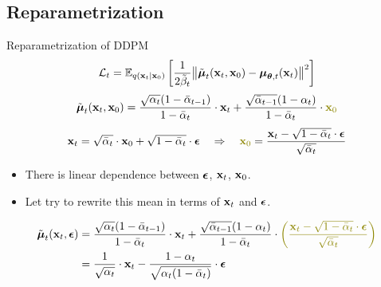 \subsection{Reparametrization}
\begin{frame}{Reparametrization of DDPM}
	\[
		\mathcal{L}_t = \mathbb{E}_{q(\mathbf{x}_t | \mathbf{x}_0)} \left[\frac{1}{2\tilde{\beta}_t} \bigl\| \tilde{\boldsymbol{\mu}}_t(\mathbf{x}_t, \mathbf{x}_0) - \boldsymbol{\mu}_{\boldsymbol{\theta}, t}(\mathbf{x}_t) \bigr\|^2  \right]
	\]
	\[
		\tilde{\bmu}_t(\bx_t, \bx_0) = \frac{\sqrt{\alpha_t}(1 - \bar{\alpha}_{t-1})}{1 - \bar{\alpha}_t} \cdot \bx_t + \frac{\sqrt{\bar{\alpha}_{t-1}}(1 - \alpha_t)}{1 - \bar{\alpha}_t} \cdot {\color{olive} \bx_0}
	\]
	\vspace{-0.2cm}
	\[
		\bx_t = \sqrt{\bar{\alpha}_t} \cdot \bx_0 + \sqrt{1 - \bar{\alpha}_t} \cdot \bepsilon \quad \Rightarrow \quad {\color{olive} \bx_0} = \frac{\bx_t -  \sqrt{1 - \bar{\alpha}_t} \cdot \bepsilon}{\sqrt{\bar{\alpha}_t}}
	\]
	\vspace{-0.3cm}
	\begin{itemize}
	\item There is linear dependence between $\boldsymbol{\epsilon}$, $\mathbf{x}_t$, $\mathbf{x}_0$.
	\item Let try to rewrite this mean in terms of $\mathbf{x}_t$ and $\boldsymbol{\epsilon}$.
	\end{itemize}
	\vspace{-0.2cm}
	\begin{align*}
		\tilde{\bmu}_t(\bx_t, \bepsilon) &= \frac{\sqrt{\alpha_t}(1 - \bar{\alpha}_{t-1})}{1 - \bar{\alpha}_t} \cdot \bx_t + \frac{\sqrt{\bar{\alpha}_{t-1}}(1 - \alpha_t)}{1 - \bar{\alpha}_t} \cdot {\color{olive} \left(\frac{\bx_t -  \sqrt{1 - \bar{\alpha}_t} \cdot \bepsilon}{\sqrt{\bar{\alpha}_t}}\right)} \\
		&= \frac{1}{\sqrt{\alpha_t}} \cdot \bx_t - \frac{1 - \alpha_t}{\sqrt{\alpha_t (1 - \bar{\alpha}_t)}} \cdot \bepsilon
	\end{align*}
	\end{frame}
